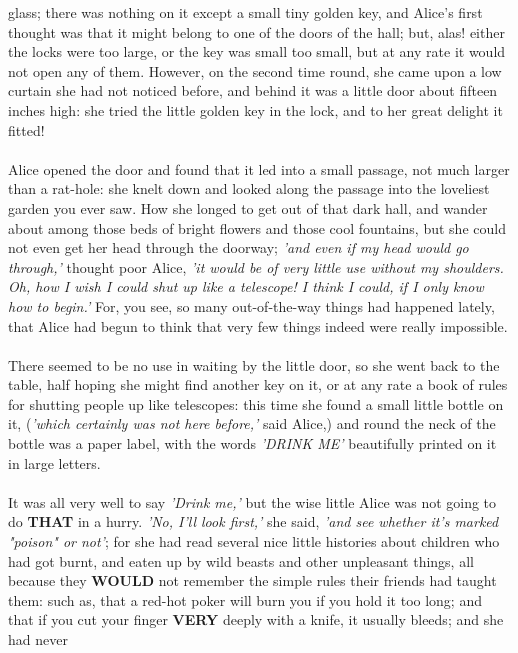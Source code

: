 \documentclass[12pt]{article}
\begin{document}
glass; there was nothing on it except a {\scriptsize small tiny golden key}, and Alice's
first thought was that it might belong to one of the doors of the hall;
but, alas! either the locks were {\Large too large}, or the key was {\scriptsize small too small},
but at any rate it would not open any of them. However, on the second
time round, she came upon a low curtain she had not noticed before, and
behind it was a little door about fifteen inches high: she tried the
little golden key in the lock, and to her great delight it fitted!\\\\Alice opened the door and found that it led into a small passage, not
much larger than a rat-hole: she knelt down and looked along the passage
into the loveliest garden you ever saw. How she longed to get out of
that dark hall, and wander about among those beds of bright flowers and
those cool fountains, but she could not even get her head through the
doorway; \textit{'and even if my head would go through,'} thought poor Alice, \textit{'it
would be of very little use without my shoulders. Oh, how I wish I could
shut up like a telescope! I think I could, if I only know how to begin.'}
For, you see, so many out-of-the-way things had happened lately,
that Alice had begun to think that very few things indeed were really
impossible.\\\\There seemed to be no use in waiting by the little door, so she went
back to the table, half hoping she might find another key on it, or at
any rate a book of rules for shutting people up like telescopes: this
time she found a {\scriptsize small little bottle} on it, (\textit{'which certainly was not here
    before,'} said Alice,) and round the neck of the bottle was a paper
label, with the words \emph{'DRINK ME'} beautifully printed on it in large
letters.\\\\It was all very well to say \emph{'Drink me,'} but the wise little Alice was
not going to do \textbf{THAT} in a hurry. \textit{'No, I'll look first,'} she said, \textit{'and
see whether it's marked "poison" or not'}; for she had read several nice
little histories about children who had got burnt, and eaten up by wild
beasts and other unpleasant things, all because they \textbf{WOULD} not remember
the simple rules their friends had taught them: such as, that a red-hot
poker will burn you if you hold it too long; and that if you cut your
finger \textbf{VERY} deeply with a knife, it usually bleeds; and she had never
\end{document}
